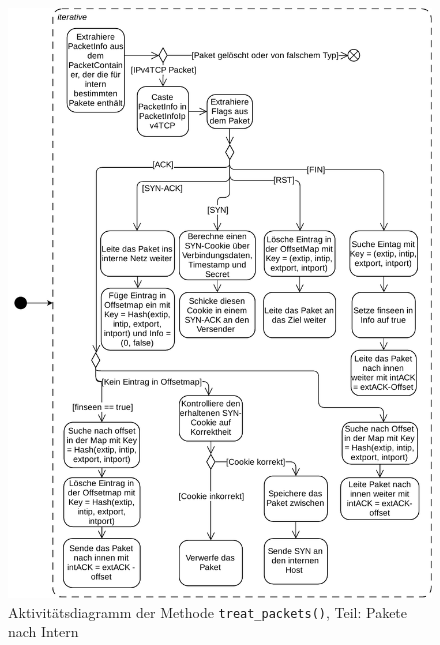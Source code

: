 \documentclass[../review_3.tex]{subfiles}
\begin{document}
\begin{figure}[h]
    \centering
    \includegraphics[width=0.98\linewidth]{img/treat_packets_0.pdf}
    \caption{Aktivitätsdiagramm der Methode \texttt{treat\_packets()}, Teil: Pakete nach Intern}
    \label{Aktivität_treat_packet_0}
\end{figure}
\end{document}
